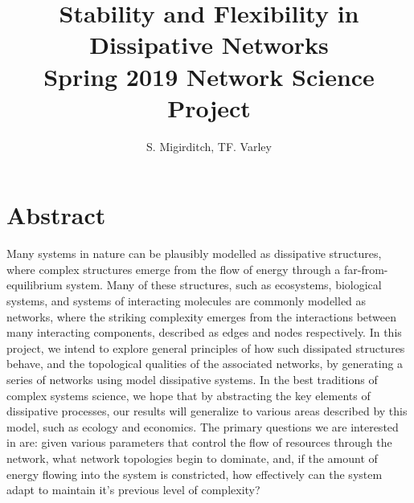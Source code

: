 \documentclass{paper}
\title{Stability and Flexibility in Dissipative Networks \\ \textnormal{Spring 2019 Network Science Project}}
\author{S. Migirditch, TF. Varley}
\begin{document}
	
	\maketitle
	\section*{Abstract}
	Many systems in nature can be plausibly modelled as dissipative structures, where complex structures emerge from the flow of energy through a far-from-equilibrium system. Many of these structures, such as ecosystems, biological systems, and systems of interacting molecules are commonly modelled as networks, where the striking complexity emerges from the interactions between many interacting components, described as edges and nodes respectively. In this project, we intend to explore general principles of how such dissipated structures behave, and the topological qualities of the associated networks, by generating a series of networks using model dissipative systems. In the best traditions of complex systems science, we hope that by abstracting the key elements of dissipative processes, our results will generalize to various areas described by this model, such as ecology and economics. The primary questions we are interested in are: given various parameters that control the flow of resources through the network, what network topologies begin to dominate, and, if the amount of energy flowing into the system is constricted, how effectively can the system adapt to maintain it's previous level of complexity? 
	\newline
\end{document}
